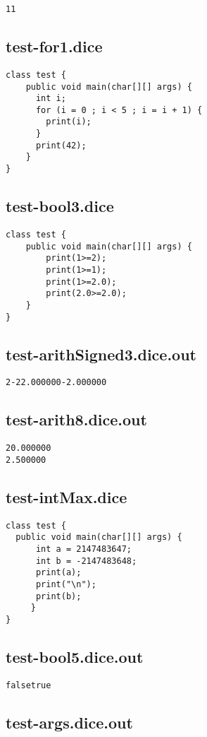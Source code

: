 \begin{verbatim}
11
\end{verbatim}\pagebreak\subsection{test-for1.dice}
\begin{verbatim}
class test {
	public void main(char[][] args) {
	  int i;
	  for (i = 0 ; i < 5 ; i = i + 1) {
	    print(i);
	  }
	  print(42);
	}
}
\end{verbatim}\pagebreak\subsection{test-bool3.dice}
\begin{verbatim}
class test {
	public void main(char[][] args) {
		print(1>=2);
		print(1>=1);
		print(1>=2.0);
		print(2.0>=2.0);
	}
}
\end{verbatim}\pagebreak\subsection{test-arithSigned3.dice.out}
\begin{verbatim}
2-22.000000-2.000000
\end{verbatim}\pagebreak\subsection{test-arith8.dice.out}
\begin{verbatim}
20.000000
2.500000
\end{verbatim}\pagebreak\subsection{test-intMax.dice}
\begin{verbatim}
class test {
  public void main(char[][] args) {
      int a = 2147483647;
      int b = -2147483648;
      print(a);
      print("\n");
      print(b);
     }
}
\end{verbatim}\pagebreak\subsection{test-bool5.dice.out}
\begin{verbatim}
falsetrue
\end{verbatim}\pagebreak\subsection{test-args.dice.out}
